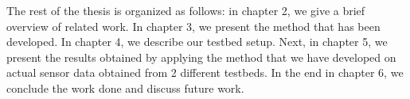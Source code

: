 The rest of the thesis is organized as follows: in chapter 2, we give a brief overview of related work. In chapter 3, we present the method that has been developed. In chapter 4, we describe our testbed setup. Next, in chapter 5, we present the results obtained by applying the method that we have developed on actual sensor data obtained from 2 different testbeds. In the end in chapter 6, we conclude the work done and discuss future work.






\vspace{1\baselineskip}

\noindent

